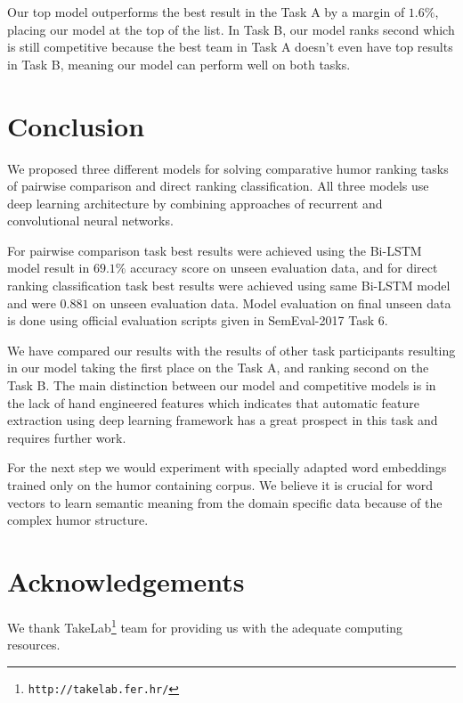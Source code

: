 \documentclass[10pt, a4paper]{article}
\begin{document}
Our top model outperforms the best result in the Task A by a margin of
$1.6\%$, placing our model at the top of the list. In Task B, our model ranks
second which is still competitive because the best team in Task A doesn't even
have top results in Task B, meaning our model can perform well on both tasks.


\section{Conclusion}
We proposed three different models for solving comparative humor ranking tasks
of pairwise comparison and direct ranking classification. All three
models use deep learning architecture by combining approaches of recurrent and
convolutional neural networks.

For pairwise comparison task best results were achieved using the Bi-LSTM model
result in $69.1\%$ accuracy score on unseen evaluation data, and for
direct ranking classification task best results were achieved using same
Bi-LSTM model and were $0.881$ on unseen evaluation data. Model
evaluation on final unseen data is done using official evaluation scripts given
in SemEval-2017 Task 6.

We have compared our results with the results of other task participants resulting
in our model taking the first place on the Task A, and ranking second on the Task B.
The main distinction between our model and competitive models is in the lack of
hand engineered features which indicates that automatic feature extraction using
deep learning framework has a great prospect in this task and requires further work.

For the next step we would experiment with specially adapted word embeddings
trained only on the humor containing corpus. We believe it is crucial for word
vectors to learn semantic meaning from the domain specific data because of the
complex humor structure. 

\section*{Acknowledgements}

We thank TakeLab\footnote{\texttt{http://takelab.fer.hr/}} team for providing
us with the adequate computing resources.


 
\end{document}
